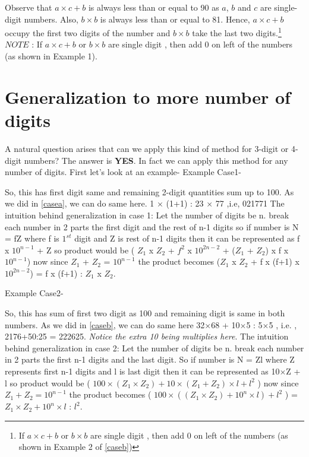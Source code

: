 \documentclass[a4paper,10pt]{article}
\begin{document}
Observe that $a \times c + b$ is always less than or equal to 90 as $a$, $b$ and $c$ are single-digit numbers. Also, $b \times b $ is always less than or equal to 81. Hence, $a \times c + b$ occupy the first two digits of the number and $b\times b$ take the last two digits.\footnote{If $a \times c + b$ or $b\times b$ are single digit , then add 0 on left of the numbers (as shown in Example 2 of \ref{caseb})} \newline
$NOTE$ : If $a \times c + b$ or $b\times b$ are single digit , then add 0 on left of the numbers (as shown in Example 1).

\section{Generalization to more number of digits}
A natural question arises that can we apply this kind of method for 3-digit or 4-digit numbers? The answer is \textbf{YES}. In fact we can apply this method for any number of digits.
First let's look at an example-
\newline
Example Case1-
\begin{center}
\qquad
\end{center}
So, this has first digit same and remaining 2-digit quantities sum up to 100. As we did in \ref{casea}, we can do same here. 1 $\times$ (1+1) : 23 $\times$ 77 ,i.e, 021771 \newline
The intuition behind generalization in case 1: Let the number of digits be n. break each number in 2 parts the first digit and the rest of n-1 digits so if number is N = fZ where f is $1^{st}$ digit and Z is rest of n-1 digits then it can be represented as f x $10^{n-1}$ + Z so product would be ( $Z_1$ x $Z_2$  + $f^2$ x $10^{2n-2}$ +  ($Z_1$ + $Z_2$) x f x $10^{n-1}$) now since $Z_1$ + $Z_2$ = $10^{n-1}$ the product becomes ($Z_1$ x $Z_2$  + f x (f+1) x $10^{2n-2}$) =  f x (f+1) : $Z_1$ x $Z_2$.               

Example Case2-
\begin{center}
\qquad
\end{center}
So, this has sum of first two digit as 100 and remaining digit is same in both numbers. As we did in \ref{caseb}, we can do same here 32$\times$68 + 10$\times$5 : 5$\times$5 , i.e. , 2176+50:25 = 222625. \emph{Notice the extra 10 being multiplies here}.\newline
The intuition behind generalization in case 2: Let the number of digits be n. break each number in 2 parts the first n-1 digits and the last digit. So if number is N = Zl where Z represents first n-1 digits and l is last digit then it can be represented as 10$\times$Z + l so product would be ( $100\times (Z_1\times Z_2) + 10\times  (Z_1+Z_2) \times l + l^2$ ) now since $Z_1 + Z_2 = 10^{n-1}$ the product becomes ( $100\times ((Z_1\times Z_2) + 10^{n}\times l) + l^2$ ) = $Z_1\times Z_2 + 10^{n}\times l$ : $l^2$.



\end{document}

